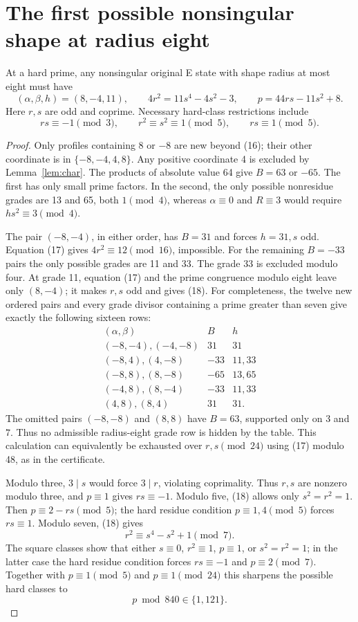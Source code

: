 \section{The first possible nonsingular shape at radius eight}
\begin{theorem}\label{thm:eight}
At a hard prime, any nonsingular original E state with shape radius at most eight
must have
\[
 \boxed{(\alpha,\beta,h)=(8,-4,11),\qquad
 4r^2=11s^4-4s^2-3,\qquad p=44rs-11s^2+8.}               \tag{18}
\]
Here $r,s$ are odd and coprime. Necessary hard-class restrictions include
\[
 rs\equiv-1\pmod3,\qquad r^2\equiv s^2\equiv1\pmod5,
 \qquad rs\equiv1\pmod5.
\]
\end{theorem}
\begin{proof}
Only profiles containing $8$ or $-8$ are new beyond (16); their other coordinate
is in $\{-8,-4,4,8\}$. Any positive coordinate 4 is excluded by
Lemma~\ref{lem:char}. The products of absolute value 64 give $B=63$ or $-65$.
The first has only small prime factors. In the second, the only possible
nonresidue grades are 13 and 65, both $1\pmod4$, whereas $\alpha\equiv0$ and
$R\equiv3$ would require $hs^2\equiv3\pmod4$.

The pair $(-8,-4)$, in either order, has $B=31$ and forces $h=31,s$ odd.
Equation (17) gives $4r^2\equiv12\pmod{16}$, impossible.
For the remaining $B=-33$ pairs the only possible grades are 11 and 33.
The grade 33 is excluded modulo four. At grade 11, equation (17) and the prime
congruence modulo eight leave only $(8,-4)$; it makes $r,s$ odd and gives (18).
For completeness, the twelve new ordered pairs and every grade divisor
containing a prime greater than seven give exactly the following sixteen rows:
\[
\begin{array}{c|c|c}
(\alpha,\beta)&B&h\\ \hline
(-8,-4),(-4,-8)&31&31\\
(-8,4),(4,-8)&-33&11,33\\
(-8,8),(8,-8)&-65&13,65\\
(-4,8),(8,-4)&-33&11,33\\
(4,8),(8,4)&31&31.
\end{array}
\]
The omitted pairs $(-8,-8)$ and $(8,8)$ have $B=63$, supported only on
$3$ and $7$. Thus no admissible radius-eight grade row is hidden by the table.
This calculation can equivalently be exhausted over $r,s\pmod{24}$ using (17)
modulo 48, as in the certificate.

Modulo three, $3\mid s$ would force $3\mid r$, violating coprimality.
Thus $r,s$ are nonzero modulo three, and $p\equiv1$ gives $rs\equiv-1$.
Modulo five, (18) allows only $s^2=r^2=1$. Then $p\equiv2-rs\pmod5$;
the hard residue condition $p\equiv1,4\pmod5$ forces $rs\equiv1$.
Modulo seven, (18) gives
\[
 r^2\equiv s^4-s^2+1\pmod7.
\]
The square classes show that either $s\equiv0$, $r^2\equiv1$, $p\equiv1$,
or $s^2=r^2=1$; in the latter case the hard residue condition forces
$rs\equiv-1$ and $p\equiv2\pmod7$. Together with $p\equiv1\pmod5$ and
$p\equiv1\pmod{24}$ this sharpens the possible hard classes to
\[
 p\bmod840\in\{1,121\}.
\]
\end{proof}

